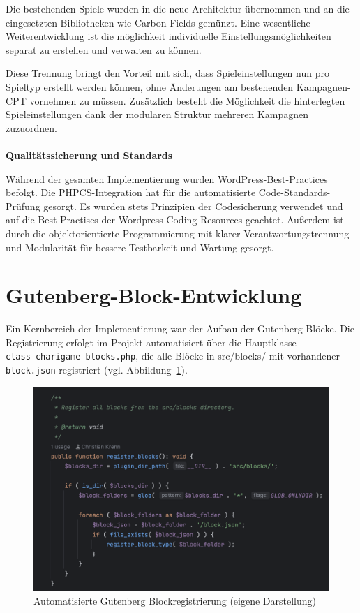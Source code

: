 Die bestehenden Spiele wurden in die neue Architektur übernommen und an die eingesetzten Bibliotheken wie Carbon Fields gemünzt.
Eine wesentliche Weiterentwicklung ist die möglichkeit individuelle Einstellungsmöglichkeiten separat zu erstellen und verwalten zu können.

Diese Trennung bringt den Vorteil mit sich, dass Spieleinstellungen nun pro Spieltyp erstellt werden können, ohne Änderungen am bestehenden Kampagnen-CPT vornehmen zu müssen.
Zusätzlich besteht die Möglichkeit die hinterlegten Spieleinstellungen dank der modularen Struktur mehreren Kampagnen zuzuordnen.
\\\\
\textbf{Qualitätssicherung und Standards}

Während der gesamten Implementierung wurden WordPress-Best-Practices befolgt.
Die PHPCS-Integration hat für die automatisierte Code-Standards-Prüfung gesorgt.
Es wurden stets Prinzipien der Codesicherung verwendet und auf die Best Practises der Wordpress Coding Resources geachtet.
Außerdem ist durch die objektorientierte Programmierung mit klarer Verantwortungstrennung und Modularität für bessere Testbarkeit und Wartung gesorgt.

\section{Gutenberg-Block-Entwicklung}
Ein Kernbereich der Implementierung war der Aufbau der Gutenberg-Blöcke.
Die Registrierung erfolgt im Projekt automatisiert über die Hauptklasse\\ \texttt{class-charigame-blocks.php}, die alle Blöcke in src/blocks/ mit vorhandener\\ \texttt{block.json} registriert (vgl. Abbildung~\ref{fig:new-block-reg}).

\begin{figure}[H]
    \centering
    \includegraphics[width=1.0\textwidth]{images/new_blocks}
    \caption{Automatisierte Gutenberg Blockregistrierung (eigene Darstellung)}
    \label{fig:new-block-reg}
\end{figure}

